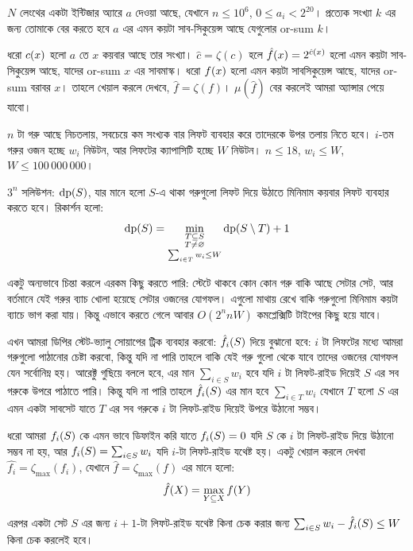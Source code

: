 \begin{example}
  $N$ লেংথের একটা ইন্টিজার অ্যারে $a$ দেওয়া আছে, যেখানে $n \le 10^6$, $0 \le
  a_i < 2^{20}$। প্রত্যেক সংখ্যা $k$ এর জন্য তোমাকে বের করতে হবে $a$ এর এমন
  কয়টা সাব-সিকুয়েন্স আছে যেগুলোর or-sum $k$।
\end{example}
\begin{solution}
  ধরো $c(x)$ হলো $a$ তে $x$ কয়বার আছে তার সংখ্যা। $\hat{c} = \zeta(c)$
  হলে $\hat{f}(x) = 2^{\hat{c}(x)}$ হলো এমন কয়টা সাব-সিকুয়েন্স আছে,
  যাদের or-sum $x$ এর সাবমাস্ক। ধরো $f(x)$ হলো এমন কয়টা সাবসিকুয়েন্স আছে,
  যাদের or-sum বরাবর $x$। তাহলে খেয়াল করলে দেখবে, $\hat{f} = \zeta(f)$।
  $\mu(\hat{f})$ বের করলেই আমরা অ্যান্সার পেয়ে যাবো।
\end{solution}
\begin{example}[\href{http://www.usaco.org/index.php?page=%
  viewproblem2&cpid=129}{USACO 2012 - Skyscraper}]
  $n$ টা গরু আছে নিচতলায়, সবচেয়ে কম সংখ্যক বার লিফট ব্যবহার করে তাদেরকে উপর
  তলায় নিতে হবে। $i$-তম গরুর ওজন হচ্ছে $w_i$ নিউটন, আর লিফটের ক্যাপাসিটি
  হচ্ছে $W$ নিউটন। $n \le 18$, $w_i \le W$, $W \le 100\,000\,000$।
\end{example}
\begin{solution}
  $3^n$ সলিউশন: $\text{dp}(S)$, যার মানে হলো $S$-এ
  থাকা গরুগুলো লিফট দিয়ে উঠাতে মিনিমাম কয়বার লিফট ব্যবহার করতে হবে।
  রিকার্শন হলো:
  \[
    \text{dp}(S) = \min_{\substack{T \subseteq S\\T \ne \varnothing\\\sum_{i \in
    T} w_i \le W}} \text{dp}(S \setminus T) + 1
  \]

  একটু অন্যভাবে চিন্তা করলে এরকম কিছু করতে পারি: স্টেটে থাকবে কোন কোন গরু
  বাকি আছে সেটার সেট, আর বর্তমানে যেই গরুর ব্যাচ খোলা হয়েছে সেটার ওজনের
  যোগফল। এগুলো মাথায় রেখে বাকি গরুগুলো মিনিমাম কয়টা ব্যাচে ভাগ করা যায়।
  কিন্তু এভাবে করতে গেলে আবার $O(2^n n W)$ কমপ্লেক্সিটি টাইপের কিছু হয়ে যাবে।
  
  এখন আমরা ডিপির স্টেট-ভ্যালু সোয়াপের ট্রিক ব্যবহার করবো:
  $\hat{f_i}(S)$ দিয়ে বুঝানো হবে: $i$ টা লিফটের মধ্যে আমরা গরুগুলো
  পাঠানোর চেষ্টা করবো,
  কিন্তু যদি না পারি তাহলে বাকি যেই গরু গুলো থেকে যাবে তাদের ওজনের যোগফল যেন
  সর্বোনিম্ন হয়। আরেক্টু গুছিয়ে বললে হবে, এর মান $\sum_{i \in S} w_i$ হবে যদি
  $i$ টা লিফট-রাইড দিয়েই $S$ এর সব গরুকে উপরে পাঠাতে পারি। কিন্তু যদি না পারি
  তাহলে $\hat{f_i}(S)$ এর মান হবে $\sum_{i \in T} w_i$ যেখানে $T$ হলো $S$
  এর এমন একটা সাবসেট যাতে $T$ এর সব গরুকে $i$ টা লিফট-রাইড দিয়েই উপরে উঠানো
  সম্ভব।

  ধরো আমরা $f_i(S)$ কে এমন ভাবে ডিফাইন করি যাতে $f_i(S) = 0$ যদি $S$
  কে $i$ টা লিফট-রাইড দিয়ে উঠানো সম্ভব না হয়, আর $f_i(S) = \sum_{i \in
  S} w_i$ যদি $i$-টা লিফট-রাইড যথেষ্ট হয়। একটু খেয়াল করলে দেখবা $\hat{f_i} =
  \zeta_{\max}(f_i)$, যেখানে $\hat{f} = \zeta_{\max}(f)$ এর মানে হলো:
  \[
    \hat{f}(X) = \max_{Y \subseteq X} f(Y)
  \]
  
  এরপর একটা সেট $S$ এর জন্য $i+1$-টা লিফট-রাইড যথেষ্ট কিনা চেক করার জন্য
  $\sum_{i \in S} w_i - \hat{f_i}(S) \le W$ কিনা চেক করলেই হবে।
\end{solution}
